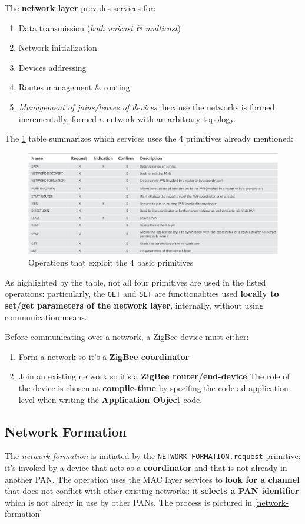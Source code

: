\documentclass[10pt,a4paper]{report}
\theoremstyle{definition}
\begin{document}
The \textbf{network layer} provides services for:
\begin{enumerate}
	\item 
	Data transmission (\textit{both unicast \& multicast})
	\item 
	Network initialization
	\item 
	Devices addressing
	\item 
	Routes management \& routing
	\item 
	\textit{Management of joins/leaves of devices}: because the networks is formed incrementally, formed a network with an arbitrary topology.
\end{enumerate}

The \ref{table-primitives} table summarizes which services uses the 4 primitives already mentioned:

\begin{figure}[h!]
	\centering\includegraphics[scale=0.25]{images/Pasted image 20230307165435.png}
	\caption{Operations that exploit the 4 basic primitives}
	\label{table-primitives}
\end{figure}
As highlighted by the table, not all four primitives are used in the listed operations: particularly, the \texttt{GET} and \texttt{SET} are functionalities used \textbf{locally to set/get parameters of the network layer}, internally, without using communication means.

Before communicating over a network, a ZigBee device must either:
\begin{enumerate}
	\item 
	Form a network so it's a \textbf{ZigBee coordinator}
	\item 
	Join an existing network so it's a \textbf{ZigBee router/end-device}
	The role of the device is chosen at \textbf{compile-time} by specifing the code ad application level when writing the \textbf{Application Object} code.
\end{enumerate}


\subsection{Network Formation}\label{sec:network-formation}
The \textit{network formation} is initiated by the \texttt{NETWORK-FORMATION.request} primitive: it's invoked by a device that acts as a \textbf{coordinator} and that is not already in another PAN.
The operation uses the MAC layer services to \textbf{look for a channel} that does not conflict with other existing networks: it \textbf{selects a PAN identifier} which is not alredy in use by other PANs. The process is pictured in \ref{network-formation}
\end{document}

